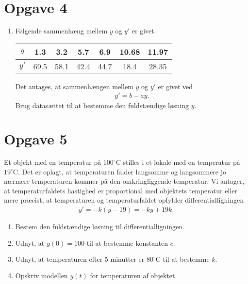 \section*{Opgave 4}
\begin{enumerate}[label=\roman*)]
	\item Følgende sammenhæng mellem $y$ og $y'$ er givet.
	\begin{center}
	\begin{tabular}{c|c|c|c|c|c|c}
		$y$ & 1.3 & 3.2 & 5.7 & 6.9 & 10.68 & 11.97\\
		\hline
		 $y'$ & 69.5 & 58.1 & 42.4 & 44.7 & 18.4 & 28.35
	\end{tabular}
	\end{center}
	Det antages, at sammenhængen mellem $y$ og $y'$ er givet ved
	\begin{align*}
		y' = b-ay.
	\end{align*}
	Brug datasættet til at bestemme den fuldstændige løsning $y$. 
\end{enumerate}

\section*{Opgave 5}
	Et objekt med en temperatur på $100^\circ$C stilles i et lokale med en temperatur på $19^\circ$C. Det er oplagt, at temperaturen falder langsomme og langsommere jo nærmere
	temperaturen kommer på den omkringliggende temperatur. Vi antager, at temperaturfaldets hastighed er proportional med objektets temperatur eller mere præcist, at 
	temperaturen og temperaturfaldet opfylder differentialligningen
	\begin{align*}
		y' = -k(y-19) = -ky+19k.
	\end{align*}
	\begin{enumerate}[label=\roman*)]
		\item Bestem den fuldstændige løsning til differentialligningen. 
		\item Udnyt, at $y(0) = 100$ til at bestemme konstanten $c$. 
		\item Udnyt, at temperaturen efter 5 minutter er $80^\circ$C til at bestemme $k$. 
		\item Opskriv modellen $y(t)$ for temperaturen af objektet. 
	\end{enumerate}